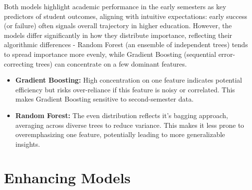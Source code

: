 \documentclass[twoside,final]{hcmut-report}
\begin{document}
Both models highlight academic performance in the early semesters as key predictors of student outcomes, aligning with intuitive expectations: early success (or failure) often signals overall trajectory in higher education. However, the models differ significantly in how they distribute importance, reflecting their algorithmic differences - Random Forest (an ensemble of independent trees) tends to spread importance more evenly, while Gradient Boosting (sequential error-correcting trees) can concentrate on a few dominant features.
\begin{itemize}
  \item \textbf{Gradient Boosting:} High concentration on one feature indicates potential efficiency but risks over-reliance if this feature is noisy or correlated. This makes Gradient Boosting sensitive to second-semester data.
  \item \textbf{Random Forest:} The even distribution reflects it's bagging approach, averaging across diverse trees to reduce variance. This makes it less prone to overemphasizing one feature, potentially leading to more generalizable insights.
\end{itemize}

\section{Enhancing Models}
\end{document}
